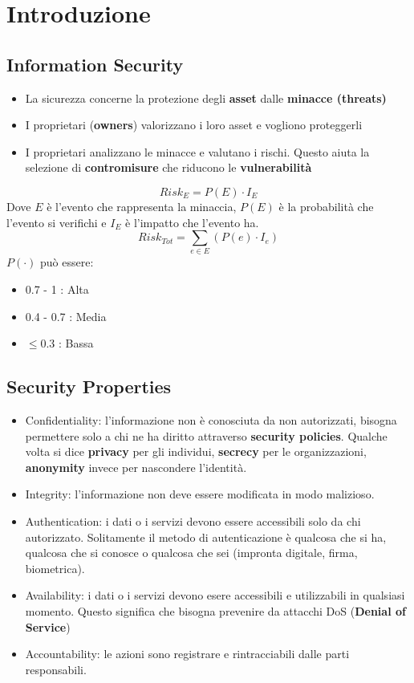 \documentclass[12pt, a4paper]{report}
\begin{document}
\newpage
\tableofcontents
\chapter{Introduzione}
\section{Information Security}
\begin{itemize}
    \item La sicurezza concerne la protezione degli \textbf{asset} dalle \textbf{minacce (threats)}
    \item I proprietari (\textbf{owners}) valorizzano i loro asset e vogliono  proteggerli
    \item I proprietari analizzano le minacce e valutano i rischi. Questo aiuta la selezione di \textbf{contromisure} che riducono le \textbf{vulnerabilità}
\end{itemize}
\begin{equation*}
    Risk_{E} = P(E) \cdot I_{E}
\end{equation*}
Dove $E$ è l'evento che rappresenta la minaccia, $P(E)$ è la probabilità che l'evento si verifichi e $I_{E}$ è l'impatto che l'evento ha.
\begin{equation*}
    Risk_{Tot} = \sum_{e\in E} (P(e) \cdot I_{e})
\end{equation*}
$P(\cdot)$ può essere:
\begin{itemize}
    \item 0.7 - 1 : Alta
    \item 0.4 - 0.7 : Media
    \item $\leq 0.3$ : Bassa
\end{itemize}
\section{Security Properties}
\begin{itemize}
    \item Confidentiality: l'informazione non è conosciuta da non autorizzati, bisogna permettere solo a chi ne ha diritto attraverso \textbf{security policies}. Qualche volta si dice \textbf{privacy} per gli individui, \textbf{secrecy} per le organizzazioni, \textbf{anonymity} invece per nascondere l'identità.
    \item Integrity: l'informazione non deve essere modificata in modo malizioso.
    \item Authentication: i dati o i servizi devono essere accessibili solo da chi autorizzato. Solitamente il metodo di autenticazione è qualcosa che si ha, qualcosa che si conosce o qualcosa che sei (impronta digitale, firma, biometrica).
    \item Availability: i dati o i servizi devono esere accessibili e utilizzabili in qualsiasi momento. Questo significa che bisogna prevenire da attacchi DoS (\textbf{Denial of Service})
    \item Accountability: le azioni sono registrare e rintracciabili dalle parti responsabili.
\end{itemize}
\end{document}
